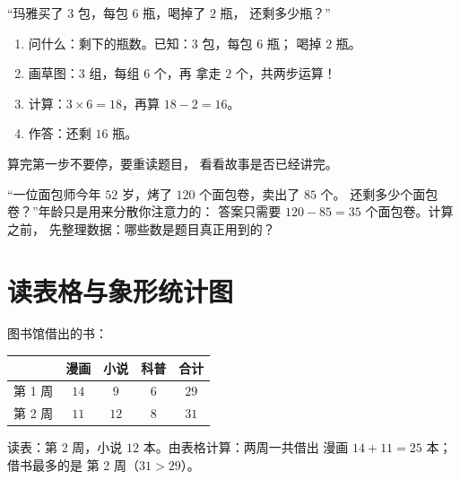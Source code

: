 \begin{example}[两步应用题]\label{ex:g3:problems:twostep}
“玛雅买了 $3$ 包，每包 $6$ 瓶，喝掉了 $2$ 瓶，
还剩多少瓶？”
\begin{enumerate}
  \item 问什么：剩下的瓶数。已知：$3$ 包，每包 $6$ 瓶；
        喝掉 $2$ 瓶。
  \item 画草图：$3$ 组，每组 $6$ 个，再
        拿走 $2$ 个，共两步运算！
  \item 计算：$3 \times 6 = 18$，再算 $18 - 2 = 16$。
  \item 作答：还剩 $16$ 瓶。
\end{enumerate}
算完第一步不要停，要重读题目，
看看故事是否已经讲完。
\end{example}

\begin{example}[没用的数]\label{ex:g3:problems:trap}
“一位面包师今年 $52$ 岁，烤了 $120$ 个面包卷，卖出了 $85$ 个。
还剩多少个面包卷？”年龄只是用来分散你注意力的：
答案只需要 $120 - 85 = 35$ 个面包卷。计算之前，
先整理数据：哪些数是题目真正用到的？
\end{example}

\section{读表格与象形统计图}

\begin{example}[表格]\label{ex:g3:problems:table}
图书馆借出的书：
\begin{center}
\renewcommand{\arraystretch}{1.3}
\begin{tabular}{l|cccc}
 & 漫画 & 小说 & 科普 & 合计 \\
\hline
第 1 周 & $14$ & $9$ & $6$ & $29$ \\
第 2 周 & $11$ & $12$ & $8$ & $31$ \\
\end{tabular}
\end{center}
读表：第 2 周，小说 $12$ 本。由表格计算：两周一共借出
漫画 $14 + 11 = 25$ 本；借书最多的是
第 2 周（$31 > 29$）。
\end{example}

